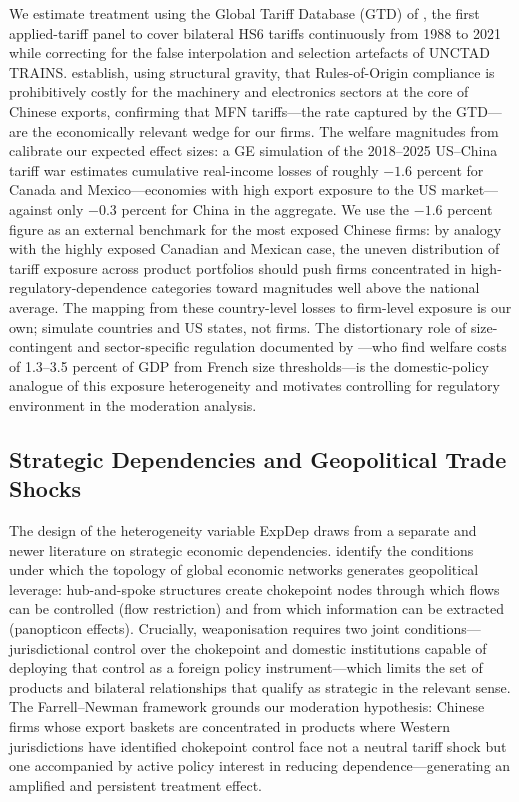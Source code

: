 We estimate treatment using the Global Tariff Database (GTD) of \citet{teti2024},
the first applied-tariff panel to cover bilateral HS6 tariffs continuously from 1988
to 2021 while correcting for the false interpolation and selection artefacts of UNCTAD
TRAINS. \citet{teti2019} establish, using structural gravity, that Rules-of-Origin
compliance is prohibitively costly for the machinery and electronics sectors at the
core of Chinese exports, confirming that MFN tariffs---the rate captured by the
GTD---are the economically relevant wedge for our firms. The welfare magnitudes from
\citet{teti2025} calibrate our expected effect sizes: a GE simulation of the
2018--2025 US--China tariff war estimates cumulative real-income losses of roughly
$-1.6$ percent for Canada and Mexico---economies with high export exposure to the US
market---against only $-0.3$ percent for China in the aggregate. We use the
$-1.6$ percent figure as an external benchmark for the most exposed Chinese firms:
by analogy with the highly exposed Canadian and Mexican case, the uneven distribution
of tariff exposure across product portfolios should push firms concentrated in
high-regulatory-dependence categories toward magnitudes well above the national
average. The mapping from these country-level losses to firm-level exposure is our
own; \citet{teti2025} simulate countries and US states, not firms. The distortionary
role of size-contingent and sector-specific regulation documented by
\citet{garicano2016}---who find welfare costs of 1.3--3.5 percent of GDP from French
size thresholds---is the domestic-policy analogue of this exposure heterogeneity and
motivates controlling for regulatory environment in the moderation analysis.

\subsection{Strategic Dependencies and Geopolitical Trade Shocks}
\label{subsec:lit_geo}

The design of the heterogeneity variable ExpDep draws from a separate and newer
literature on strategic economic dependencies. \citet{farrell2019} identify the
conditions under which the topology of global economic networks generates geopolitical
leverage: hub-and-spoke structures create chokepoint nodes through which flows can be
controlled (flow restriction) and from which information can be extracted (panopticon
effects). Crucially, weaponisation requires two joint conditions---jurisdictional
control over the chokepoint and domestic institutions capable of deploying that control
as a foreign policy instrument---which limits the set of products and bilateral
relationships that qualify as strategic in the relevant sense. The Farrell--Newman
framework grounds our moderation hypothesis: Chinese firms whose export baskets are
concentrated in products where Western jurisdictions have identified chokepoint control
face not a neutral tariff shock but one accompanied by active policy interest in
reducing dependence---generating an amplified and persistent treatment effect.

